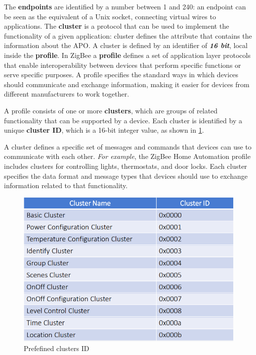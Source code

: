 \documentclass[10pt,a4paper]{report}
\theoremstyle{definition}
\begin{document}
The \textbf{endpoints} are identified by a number between 1 and 240: an endpoint can be seen as the equivalent of a Unix socket, connecting virtual wires to applications.
The \textbf{cluster} is a protocol that can be used to implement the functionality of a given application: cluster defines the attribute that contains the information about the APO. A cluster is defined by an identifier of \textit{\textbf{16 bit}}, local inside the \textbf{profile}. In ZigBee a \textbf{profile} defines a set of application layer protocols that enable interoperability between devices that perform specific functions or serve specific purposes. A profile specifies the standard ways in which devices should communicate and exchange information, making it easier for devices from different manufacturers to work together.

A profile consists of one or more \textbf{clusters}, which are groups of related functionality that can be supported by a device. Each cluster is identified by a unique \textbf{cluster ID}, which is a 16-bit integer value, as shown in \ref{cluster-table}.

A cluster defines a specific set of messages and commands that devices can use to communicate with each other. \textit{For example}, the ZigBee Home Automation profile includes clusters for controlling lights, thermostats, and door locks. Each cluster specifies the data format and message types that devices should use to exchange information related to that functionality.
\begin{figure}[h]
	\centering
	\includegraphics[scale=0.50]{images/Pasted image 20230311124737.png}
	\caption{Prefefined clusters ID}
	\label{cluster-table}
\end{figure}
\end{document}
